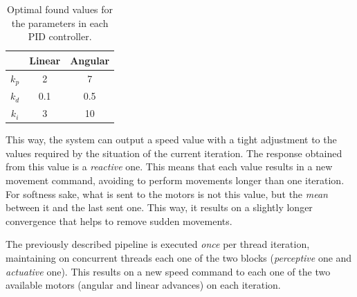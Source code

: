\begin{table}[h]
	\centering
	\begin{tabular}{|c|c|c|}
		\hline
		\textbf{} & \textbf{Linear} & \textbf{Angular} \\ \hline
		$k_p$     & 2               & 7                \\ \hline
		$k_d$     & 0.1             & 0.5              \\ \hline
		$k_i$     & 3               & 10               \\ \hline
	\end{tabular}
	\caption{Optimal found values for the parameters in each PID controller.}
	\label{tab:pids}
\end{table}

This way, the system can output a speed value with a tight adjustment to the values required by the situation of the current iteration. The response obtained from this value is a \emph{reactive} one. This means that each value results in a new movement command, avoiding to perform movements longer than one iteration. For softness sake, what is sent to the motors is not this value, but the \emph{mean} between it and the last sent one. This way, it results on a slightly longer convergence that helps to remove sudden movements.





\vspace{1.5in}

The previously described pipeline is executed \emph{once} per thread iteration, maintaining on concurrent threads each one of the two blocks (\emph{perceptive} one and \emph{actuative} one). This results on a new speed command to each one of the two available motors (angular and linear advances) on each iteration.